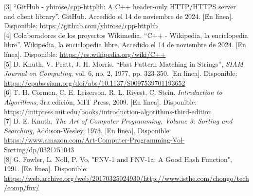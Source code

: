 \documentclass{article}
\begin{document}
[3] “GitHub - yhirose/cpp-httplib: A C++ header-only HTTP/HTTPS server and client library”. GitHub. Accedido el 14 de noviembre de 2024. [En línea]. Disponible: \href{https://github.com/yhirose/cpp-httplib}{https://github.com/yhirose/cpp-httplib}\\

[4] Colaboradores de los proyectos Wikimedia. “C++ - Wikipedia, la enciclopedia libre”. Wikipedia, la enciclopedia libre. Accedido el 14 de noviembre de 2024. [En línea]. Disponible: \href{https://es.wikipedia.org/wiki/C++}{https://es.wikipedia.org/wiki/C++}\\

[5] D. Knuth, V. Pratt, J. H. Morris. “Fast Pattern Matching in Strings”, \textit{SIAM Journal on Computing}, vol. 6, no. 2, 1977, pp. 323-350. [En línea]. Disponible: \href{https://epubs.siam.org/doi/abs/10.1137/S0097539701193652}{https://epubs.siam.org/doi/abs/10.1137/S0097539701193652}\\

[6] T. H. Cormen, C. E. Leiserson, R. L. Rivest, C. Stein. \textit{Introduction to Algorithms}, 3ra edición, MIT Press, 2009. [En línea]. Disponible: \href{https://mitpress.mit.edu/books/introduction-algorithms-third-edition}{https://mitpress.mit.edu/books/introduction-algorithms-third-edition}\\

[7] D. E. Knuth, \textit{The Art of Computer Programming, Volume 3: Sorting and Searching}, Addison-Wesley, 1973. [En línea]. Disponible: \href{https://www.amazon.com/Art-Computer-Programming-Vol-Sorting/dp/0321751043}{https://www.amazon.com/Art-Computer-Programming-Vol-Sorting/dp/0321751043}\\

[8] G. Fowler, L. Noll, P. Vo, "FNV-1 and FNV-1a: A Good Hash Function", 1991. [En línea]. Disponible: \href{https://web.archive.org/web/20170325024930/http://www.isthe.com/chongo/tech/comp/fnv/}{https://web.archive.org/web/20170325024930/http://www.isthe.com/chongo/tech/comp/fnv/}\\
\end{document}
